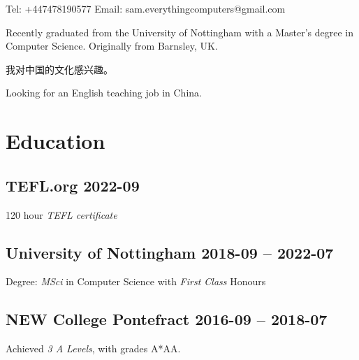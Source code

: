 


\title{}
\author{Sam Robert Whitehead}

\maketitle

\pagestyle{empty}
\thispagestyle{empty}

Tel:
+447478190577
\hfill
Email:
sam.everythingcomputers@gmail.com

\vspace{2mm}
Recently graduated from the University of Nottingham with a Master's degree in
Computer Science. Originally from Barnsley, UK.

我对中国的文化感兴趣。

Looking for an English teaching job in China.
\section{Education}
    \subsection{TEFL.org \hfill 2022-09}
        120 hour \emph{TEFL certificate}
    \subsection{University of Nottingham
        \hfill 2018-09 -- 2022-07}
        Degree: \emph{MSci} in Computer Science with \emph{First Class} Honours
    \subsection{NEW College Pontefract
        \hfill 2016-09 -- 2018-07}
        Achieved \emph{3 A Levels}, with grades
        A*AA\footnotemark[2].
